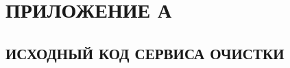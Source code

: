 \documentclass[a4paper,14pt]{extreport}
\begin{document}




\chapter*{ПРИЛОЖЕНИЕ А}

\section*{ИСХОДНЫЙ КОД СЕРВИСА ОЧИСТКИ}
\end{document}
